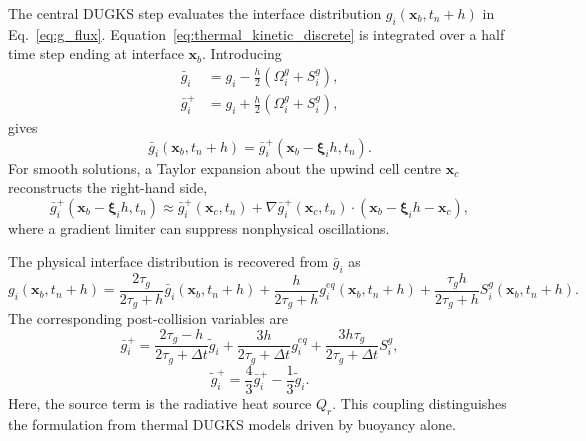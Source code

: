 \documentclass[a4paper,12pt]{ctexart}
\numberwithin{equation}{section}
\newcommand{\vb}[1]{\bm{#1}}
\newcommand{\vx}{\vb{x}}
\newcommand{\vxi}{\bm{\xi}}
\begin{document}
The central DUGKS step evaluates the interface distribution $g_i(\vx_b,t_n+h)$ in Eq.~\eqref{eq:g_flux}. Equation~\eqref{eq:thermal_kinetic_discrete} is integrated over a half time step ending at interface $\vx_b$. Introducing
\begin{equation*}
\begin{aligned}
\bar g_i&=g_i-\frac{h}{2}\left(\Omega_i^g+S_i^g\right),
\\
\bar g_i^+&=g_i+\frac{h}{2}\left(\Omega_i^g+S_i^g\right),
\end{aligned}
\end{equation*}
gives
\begin{equation*}
\bar g_i(\vx_b,t_n+h)=\bar g_i^+(\vx_b-\vxi_i h,t_n).
\end{equation*}
For smooth solutions, a Taylor expansion about the upwind cell centre $\vx_c$ reconstructs the right-hand side,
\begin{equation}
\bar g_i^+(\vx_b-\vxi_i h,t_n)
\approx \bar g_i^+(\vx_c,t_n)+\nabla\bar g_i^+(\vx_c,t_n)\cdot(\vx_b-\vxi_i h-\vx_c),
\label{eq:g_reconstruction}
\end{equation}
where a gradient limiter can suppress nonphysical oscillations.

The physical interface distribution is recovered from $\bar g_i$ as
\begin{equation*}
g_i(\vx_b,t_n+h)=\frac{2\tau_g}{2\tau_g+h}\bar g_i(\vx_b,t_n+h)
+\frac{h}{2\tau_g+h}g_i^{eq}(\vx_b,t_n+h)
+\frac{\tau_g h}{2\tau_g+h}S_i^g(\vx_b,t_n+h).
\end{equation*}
The corresponding post-collision variables are
\begin{equation}
\bar g_i^+=\frac{2\tau_g-h}{2\tau_g+\Delta t}\tilde g_i
+\frac{3h}{2\tau_g+\Delta t}g_i^{eq}
+\frac{3h\tau_g}{2\tau_g+\Delta t}S_i^g,
\label{eq:g_bar_plus}
\end{equation}
\begin{equation}
\tilde g_i^+=\frac{4}{3}\bar g_i^+-\frac{1}{3}\tilde g_i.
\label{eq:g_tilde_plus}
\end{equation}
Here, the source term is the radiative heat source $Q_r$. This coupling distinguishes the formulation from thermal DUGKS models driven by buoyancy alone.
\end{document}
